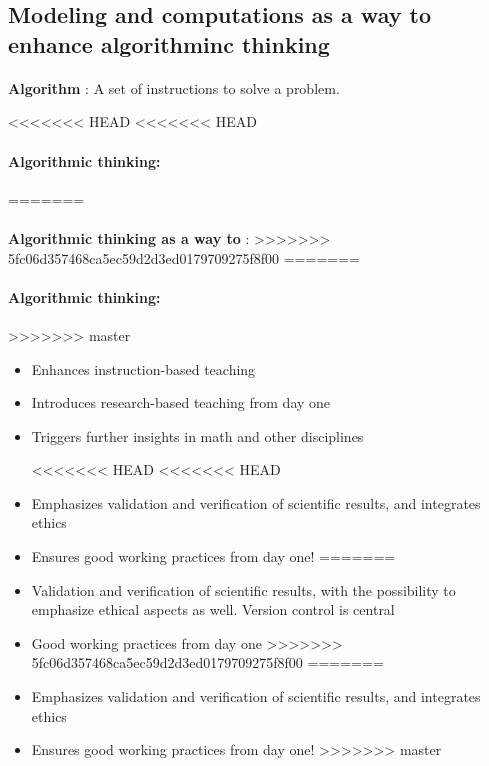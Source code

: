 \documentclass[%
<<<<<<< HEAD
<<<<<<< HEAD
oneside,                 %
final,                   %
=======
twoside,                 %
final,                   %
>>>>>>> 5fc06d357468ca5ec59d2d3ed0179709275f8f00
=======
oneside,                 %
final,                   %
>>>>>>> master
10pt]{article}
\begin{document}
\noindent



\subsection*{Modeling and computations as a way to enhance algorithminc thinking}


\paragraph{}
\textbf{Algorithm} :
A set of instructions to solve a problem.




<<<<<<< HEAD
<<<<<<< HEAD
\paragraph{Algorithmic thinking:}

=======
\paragraph{}
\textbf{Algorithmic  thinking as a way to} :
>>>>>>> 5fc06d357468ca5ec59d2d3ed0179709275f8f00
=======
\paragraph{Algorithmic thinking:}
>>>>>>> master
\begin{itemize}
\item Enhances instruction-based teaching

\item Introduces research-based teaching  from day one

\item Triggers further insights in math and other disciplines

<<<<<<< HEAD
<<<<<<< HEAD
\item Emphasizes validation and verification of scientific results, and integrates ethics

\item Ensures good working practices from day one!
=======
\item Validation and verification of scientific results, with the possibility to emphasize ethical aspects as well. Version control is central

\item Good working practices from day one
>>>>>>> 5fc06d357468ca5ec59d2d3ed0179709275f8f00
=======
\item Emphasizes validation and verification of scientific results, and integrates ethics

\item Ensures good working practices from day one!
>>>>>>> master
\end{itemize}
\end{document}
